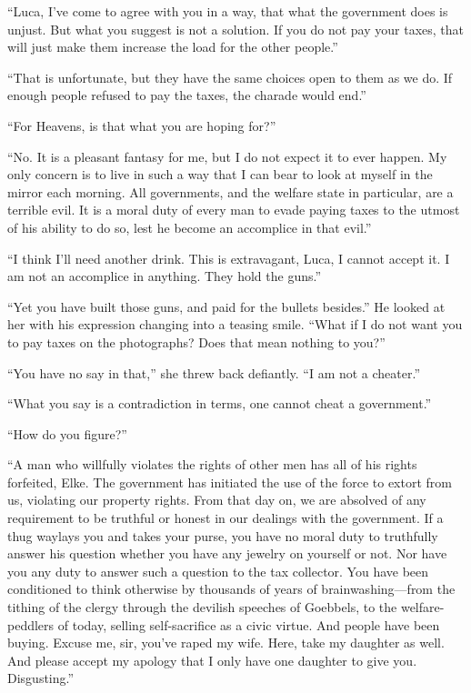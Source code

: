 ``Luca, I've come to agree with you in a way, that what the government does is unjust. But what you suggest is not a solution. If you do not pay your taxes, that will just make them increase the load for the other people.''

``That is unfortunate, but they have the same choices open to them as we do. If enough people refused to pay the taxes, the charade would end.''

``For Heavens, is that what you are hoping for?''

``No. It is a pleasant fantasy for me, but I do not expect it to ever happen. My only concern is to live in such a way that I can bear to look at myself in the mirror each morning. All governments, and the welfare state in particular, are a terrible evil. It is a moral duty of every man to evade paying taxes to the utmost of his ability to do so, lest he become an accomplice in that evil.''

``I think I'll need another drink. This is extravagant, Luca, I cannot accept it. I am not an accomplice in anything. They hold the guns.''

``Yet you have built those guns, and paid for the bullets besides.'' He looked at her with his expression changing into a teasing smile. ``What if I do not want you to pay taxes on the photographs? Does that mean nothing to you?''

``You have no say in that,'' she threw back defiantly. ``I am not a cheater.''

``What you say is a contradiction in terms, one cannot cheat a government.''

``How do you figure?''

``A man who willfully violates the rights of other men has all of his rights forfeited, Elke. The government has initiated the use of the force to extort from us, violating our property rights. From that day on, we are absolved of any requirement to be truthful or honest in our dealings with the government. If a thug waylays you and takes your purse, you have no moral duty to truthfully answer his question whether you have any jewelry on yourself or not. Nor have you any duty to answer such a question to the tax collector. You have been conditioned to think otherwise by thousands of years of brainwashing---from the tithing of the clergy through the devilish speeches of Goebbels, to the welfare-peddlers of today, selling self-sacrifice as a civic virtue. And people have been buying. Excuse me, sir, you've raped my wife. Here, take my daughter as well. And please accept my apology that I only have one daughter to give you. Disgusting.''


